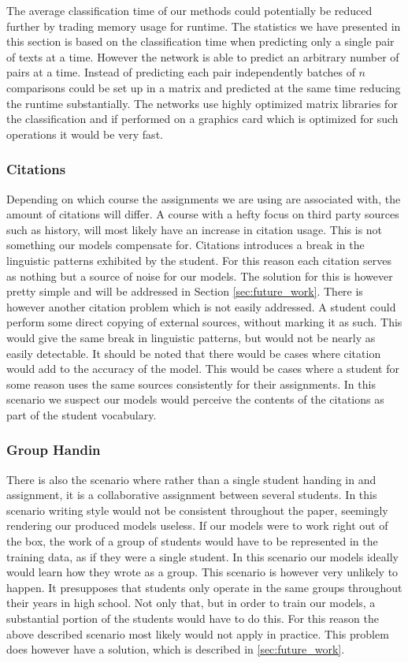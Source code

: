 The average classification time of our methods could potentially be reduced
further by trading memory usage for runtime. The statistics we have presented in
this section is based on the classification time when predicting only a single
pair of texts at a time. However the network is able to predict an arbitrary
number of pairs at a time. Instead of predicting each pair independently batches
of $n$ comparisons could be set up in a matrix and predicted at the same time
reducing the runtime substantially. The networks use highly optimized matrix
libraries for the classification and if performed on a graphics card which is
optimized for such operations it would be very fast.


\subsubsection{Citations}

Depending on which course the assignments we are using are associated with, the
amount of citations will differ. A course with a hefty focus on third party
sources such as history, will most likely have an increase in citation usage.
This is not something our models compensate for. Citations introduces a break in
the linguistic patterns exhibited by the student. For this reason each citation
serves as nothing but a source of noise for our models. The solution for this is
however pretty simple and will be addressed in Section \ref{sec:future_work}.
There is however another citation problem which is not easily addressed. A
student could perform some direct copying of external sources, without marking
it as such. This would give the same break in linguistic patterns, but would not
be nearly as easily detectable. It should be noted that there would be cases
where citation would add to the accuracy of the model. This would be cases
where a student for some reason uses the same sources consistently for their
assignments. In this scenario we suspect our models would perceive the contents
of the citations as part of the student vocabulary.


\subsubsection{Group Handin}\label{subsubsec:group_handin}

There is also the scenario where rather than a single student handing in and
assignment, it is a collaborative assignment between several students. In this
scenario writing style would not be consistent throughout the paper, seemingly
rendering our produced models useless. If our models were to work right out of
the box, the work of a group of students would have to be represented in the
training data, as if they were a single student. In this scenario our models
ideally would learn how they wrote as a group. This scenario is however very
unlikely to happen. It presupposes that students only operate in the same
groups throughout their years in high school. Not only that, but in order to
train our models, a substantial portion of the students would have to do this.
For this reason the above described scenario most likely would not apply in
practice. This problem does however have a solution, which is described in
\ref{sec:future_work}.


